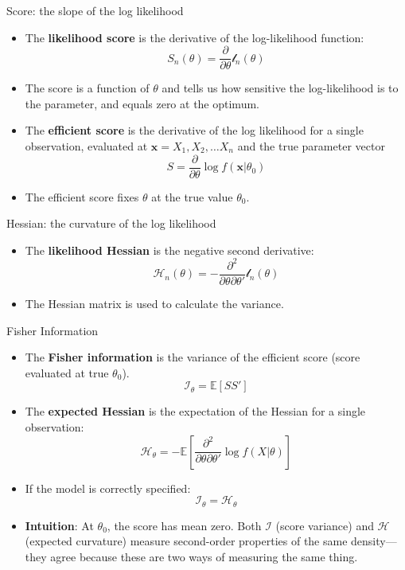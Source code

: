 \documentclass[aspectratio=169, handout, t]{beamer}
\numberwithin{equation}{section}
\begin{document}
\begin{frame}{Score: the slope of the log likelihood}

\begin{itemize}

\item The \textbf{likelihood score} is the derivative of the log-likelihood function:
$$S_n(\theta)=\frac{\partial}{\partial \theta} \mathcal{l}_n(\theta)$$\pause
\item The score is a function of $\theta$ and tells us how sensitive the log-likelihood is to the parameter, and equals zero at the optimum.\pause
\item The \textbf{efficient score} is the derivative of the log likelihood for a single observation, evaluated at $\bm{x}=X_1, X_2,\ldots X_n$ and the true parameter vector
$$S=\frac{\partial}{\partial \theta}\log f(\bm{x}|\theta_0)$$\pause
\item The efficient score fixes $\theta$ at the true value $\theta_0$.
\end{itemize}
\end{frame}



\begin{frame}{Hessian: the curvature of the log likelihood}
\begin{itemize}
\item The \textbf{likelihood Hessian} is the negative second derivative:
$$\mathcal{H}_n(\theta)=-\frac{\partial^2}{\partial \theta \partial \theta'}\mathcal{l}_n(\theta)$$
\item The Hessian matrix is used to calculate the variance.
\end{itemize}
\end{frame}


\begin{frame}{Fisher Information}

\begin{itemize}
\item The \textbf{Fisher information} is the variance of the efficient score (score evaluated at true $\theta_0$).
$$\mathcal{I}_\theta=\mathbb{E}[SS']$$\pause
\item The \textbf{expected Hessian} is the expectation of the Hessian for a single observation:
$$\mathcal{H}_\theta=-\mathbb{E}[\frac{\partial^2}{\partial \theta \partial \theta'}\log f(X|\theta)]$$\pause
\item If the model is correctly specified:
$$\mathcal{I}_\theta=\mathcal{H}_\theta$$
\item \textbf{Intuition}: At $\theta_0$, the score has mean zero. Both $\mathcal{I}$ (score variance) and $\mathcal{H}$ (expected curvature) measure second-order properties of the same density---they agree because these are two ways of measuring the same thing.
\end{itemize}
\end{frame}
\end{document}
